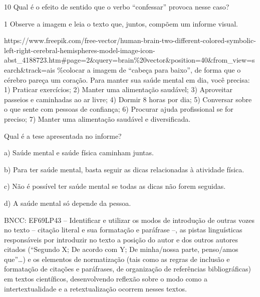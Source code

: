 {


\num{10} Qual é o efeito de sentido que o verbo ``confessar'' provoca
nesse caso?




\num{1} Observe a imagem e leia o texto que, juntos, compõem um informe
visual.

https://www.freepik.com/free-vector/human-brain-two-different-colored-symbolic-left-right-cerebral-hemispheres-model-image-icon-abst\_4188723.htm\#page=2\&query=brain\%20vector\&position=40\&from\_view=search\&track=ais
\%colocar a imagem de ``cabeça para baixo'', de forma que o cérebro
pareça um coração. Para manter sua saúde mental em dia, você precisa: 1)
Praticar exercícios; 2) Manter uma alimentação saudável; 3) Aproveitar
passeios e caminhadas ao ar livre; 4) Dormir 8 horas por dia; 5)
Conversar sobre o que sente com pessoas de confiança; 6) Procurar ajuda
profissional se for preciso; 7) Manter uma alimentação saudável e
diversificada.

Qual é a tese apresentada no informe?

a) Saúde mental e saúde física caminham juntas.

b) Para ter saúde mental, basta seguir as dicas relacionadas à atividade
física.

c) Não é possível ter saúde mental se todas as dicas não forem seguidas.

d) A saúde mental só depende da pessoa.

BNCC: EF69LP43 -- Identificar e utilizar os modos de introdução de
outras vozes no texto -- citação literal e sua formatação e paráfrase
--, as pistas linguísticas responsáveis por introduzir no texto a
posição do autor e dos outros autores citados (``Segundo X; De acordo
com Y; De minha/nossa parte, penso/amos que''\ldots) e os elementos de
normatização (tais como as regras de inclusão e formatação de citações e
paráfrases, de organização de referências bibliográficas) em textos
científicos, desenvolvendo reflexão sobre o modo como a
intertextualidade e a retextualização ocorrem nesses textos.

}
